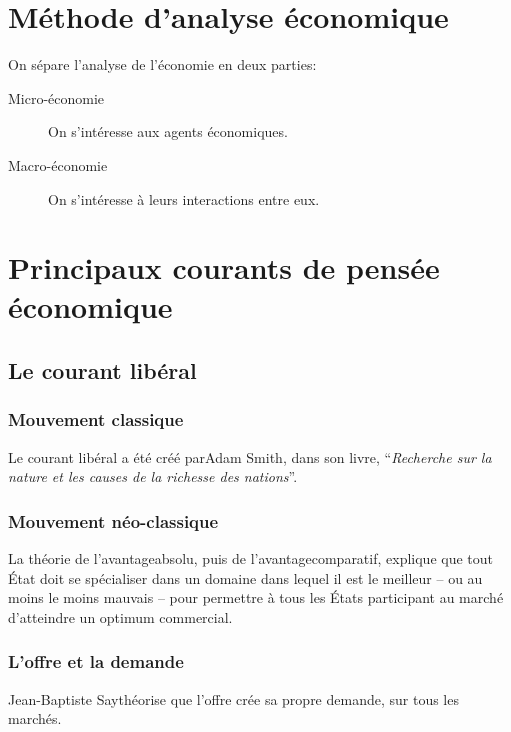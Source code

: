 \documentclass[10pt,a4paper,french]{article}
\begin{document}
\section{Méthode d'analyse économique}

On sépare l'analyse de l'économie en deux parties:
\begin{description}
\item[Micro-économie] On s'intéresse aux agents économiques.
\item[Macro-économie] On s'intéresse à leurs interactions entre eux.
\end{description}

\section{Principaux courants de pensée économique}

\subsection{Le courant libéral}

\subsubsection{Mouvement classique}

Le courant libéral a été créé parAdam Smith, dans son livre, ``\textit{Recherche sur la nature et les causes de la richesse des nations}''.

\subsubsection{Mouvement néo-classique}

La théorie de l’avantageabsolu, puis de l’avantagecomparatif, explique que tout État doit se spécialiser dans un domaine dans lequel il est le meilleur – ou au moins le moins mauvais – pour permettre à tous les États participant au marché d’atteindre un optimum commercial.

\subsubsection{L'offre et la demande}

Jean-Baptiste Saythéorise que l'offre crée sa propre demande, sur tous les marchés.
\end{document}

